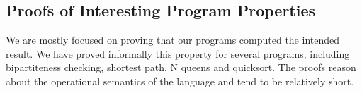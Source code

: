 \documentclass[10pt]{article}
\begin{document}
\subsection{Proofs of Interesting Program Properties}

We are mostly focused on proving that our programs computed the intended result.
We have proved informally this property for several programs, including
bipartiteness checking, shortest path, N queens and quicksort.
The proofs reason about the operational semantics of the language and tend to be
relatively short.
\end{document}
